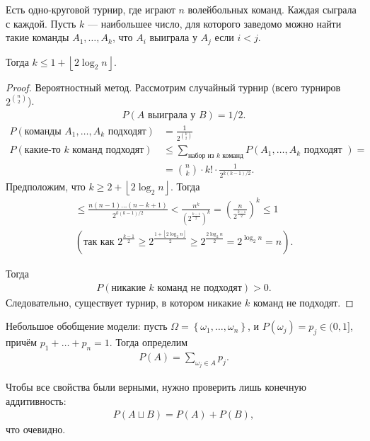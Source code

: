 \documentclass[../main.tex]{subfiles}
\begin{document}
\begin{thm}
 Есть одно-круговой турнир, где играют $n$ волейбольных команд. Каждая сыграла с каждой. Пусть $k$ --- наибольшее число, для которого заведомо можно найти такие команды  $A_1, \ldots, A_k$, что $A_i$ выиграла у $A_j$ если $i < j$.

 Тогда $k \leqslant 1 + \left\lfloor 2 \log_2 n  \right\rfloor$.
\end{thm}
\begin{proof}
 Вероятностный метод. Рассмотрим случайный турнир (всего турниров $2^{\binom n 2}$).
 \begin{align*}
  P(A \text{ выиграла у } B) = 1 / 2
 .\end{align*} 
 \begin{align*}
  P(\text{команды } A_1, \ldots, A_k \text{ подходят}) &= \frac{1}{2^{\binom k 2}} \\
  P(\text{какие-то $k$ команд подходят}) &\leqslant \sum_{\text{набор из $k$ команд}} P(A_1, \ldots, A_k \text{ подходят }) = \\
  &= \binom n k \cdot k!  \cdot \frac{1}{2^{k(k-1) / 2}}
.\end{align*} Предположим, что $k \geqslant 2 + \left\lfloor 2 \log_2 n \right\rfloor $. Тогда 
 \begin{align*}
  \leqslant \frac{n (n-1) \ldots (n-k+1)}{2^{k(k-1) / 2}} < \frac{n^{k}}{\left(2^{\frac{k-1}{2}}\right)^{k}} = \left(\frac{n}{2^{\frac{k-1}{2}}}\right)^{k} \le 1	
	\\ 	(\text{так как } 2^{\frac{k - 1}{2}} \ge 2^{\frac{1 + \left\lfloor 2 \log_2 n \right\rfloor}{2}} \ge 2^{\frac{2 \log_2 n}{2}} = 2^{\log_2 n} = n) 
 .\end{align*} 
	
 Тогда
 \begin{align*}
  P(\text{никакие $k$ команд не подходят}) > 0
 .\end{align*} Следовательно, существует турнир, в котором никакие $k$ команд не подходят.
\end{proof}

\begin{df*}
 
Небольшое обобщение модели: пусть $\Omega = \left\{ \omega_1, \ldots, \omega_n \right\}$, и $P(\omega_j) = p_j \in (0,1]$, причём $p_1 + \ldots + p_n = 1$. Тогда определим
\begin{align*}
 P(A) = \sum_{\omega_j \in A} p_j
.\end{align*}
\end{df*}

Чтобы все свойства были верными, нужно проверить лишь конечную аддитивность:
\begin{align*}
 P(A \sqcup B) = P(A) + P(B)
,\end{align*} что очевидно.
\end{document}
